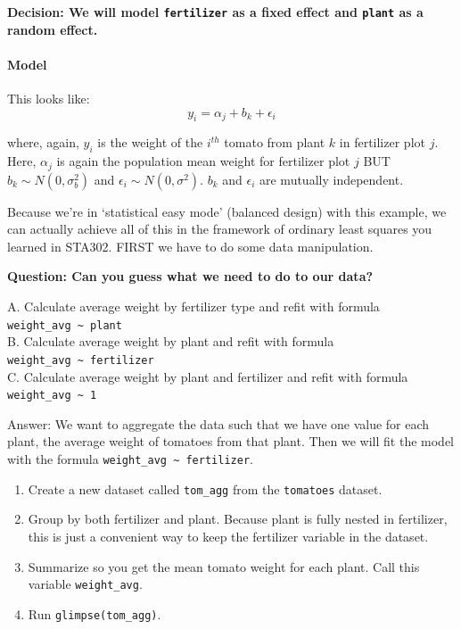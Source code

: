 \documentclass[
  openany]{book}
\providecommand{\tightlist}{%
  \setlength{\itemsep}{0pt}\setlength{\parskip}{0pt}}
\begin{document}
\textbf{Decision: We will model \texttt{fertilizer} as a fixed effect and \texttt{plant} as a random effect.}

\hypertarget{model-1}{%
\paragraph{Model}\label{model-1}}

This looks like:
\[ y_i = \alpha_j + b_k + \epsilon_i\]

where, again, \(y_{i}\) is the weight of the \(i^{th}\) tomato from plant \(k\) in fertilizer plot \(j\). Here, \(\alpha_j\) is again the population mean weight for fertilizer plot \(j\) BUT \(b_k \sim N(0, \sigma_b^2)\) and \(\epsilon_i \sim N(0, \sigma^2)\). \(b_k\) and \(\epsilon_i\) are mutually independent.

Because we're in `statistical easy mode' (balanced design) with this example, we can actually achieve all of this in the framework of ordinary least squares you learned in STA302. FIRST we have to do some data manipulation.

\textbf{Question: Can you guess what we need to do to our data?}

A. Calculate average weight by fertilizer type and refit with formula \texttt{weight\_avg\ \textasciitilde{}\ plant}\\
B. Calculate average weight by plant and refit with formula \texttt{weight\_avg\ \textasciitilde{}\ fertilizer}\\
C. Calculate average weight by plant and fertilizer and refit with formula \texttt{weight\_avg\ \textasciitilde{}\ 1}

Answer: We want to aggregate the data such that we have one value for each plant, the average weight of tomatoes from that plant. Then we will fit the model with the formula \texttt{weight\_avg\ \textasciitilde{}\ fertilizer}.

\begin{enumerate}
\def\labelenumi{\arabic{enumi}.}
\tightlist
\item
  Create a new dataset called \texttt{tom\_agg} from the \texttt{tomatoes} dataset.
\item
  Group by both fertilizer and plant. Because plant is fully nested in fertilizer, this is just a convenient way to keep the fertilizer variable in the dataset.
\item
  Summarize so you get the mean tomato weight for each plant. Call this variable \texttt{weight\_avg}.
\item
  Run \texttt{glimpse(tom\_agg)}.
\end{enumerate}
\end{document}
